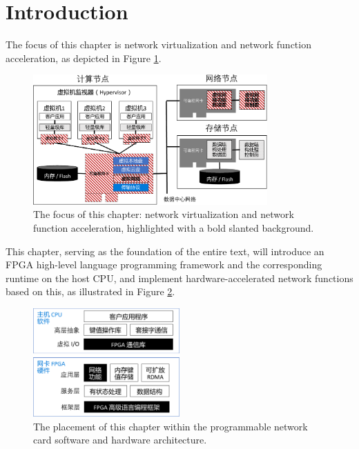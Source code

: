 \section{Introduction}

The focus of this chapter is network virtualization and network function acceleration, as depicted in Figure \ref{clicknp:fig:sys-arch}.

\begin{figure}[htbp]
	\centering
	\includegraphics[width=0.8\textwidth]{image/sys_arch.pdf}
	\caption{The focus of this chapter: network virtualization and network function acceleration, highlighted with a bold slanted background.}
	\label{clicknp:fig:sys-arch}
\end{figure}

This chapter, serving as the foundation of the entire text, will introduce an FPGA high-level language programming framework and the corresponding runtime on the host CPU, and implement hardware-accelerated network functions based on this, as illustrated in Figure \ref{clicknp:fig:sw-hw-codesign}.

\begin{figure}[htbp]
	\centering
	\includegraphics[width=0.5\textwidth]{image/sw_hw_codesign.pdf}
	\caption{The placement of this chapter within the programmable network card software and hardware architecture.}
	\label{clicknp:fig:sw-hw-codesign}
\end{figure}

